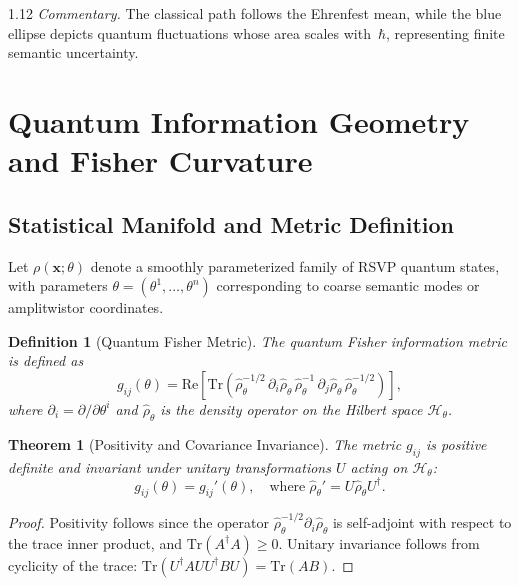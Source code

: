 \documentclass[12pt,a4paper]{article}
\numberwithin{equation}{section}
\newtheorem{definition}{Definition}[section]
\newtheorem{theorem}{Theorem}[section]
\theoremstyle{remark}
\theoremstyle{definition}
\begin{document}
\begin{spacing}{1.12}
\noindent\textit{Commentary.}
The classical path follows the Ehrenfest mean,
while the blue ellipse depicts quantum fluctuations whose area scales with~\(\hbar\),
representing finite semantic uncertainty.

\section{Quantum Information Geometry and Fisher Curvature}\label{sec:fisher-geometry}

\subsection{Statistical Manifold and Metric Definition}

Let \(\rho(\mathbf{x};\theta)\) denote a smoothly parameterized family of RSVP quantum states,
with parameters \(\theta = (\theta^1,\dots,\theta^n)\)
corresponding to coarse semantic modes or amplitwistor coordinates.

\begin{definition}[Quantum Fisher Metric]\label{def:fisher}
The quantum Fisher information metric is defined as
\[
g_{ij}(\theta)
= \mathrm{Re}\!\left[\mathrm{Tr}\!\left(
\hat{\rho}_\theta^{-1/2}\,\partial_i \hat{\rho}_\theta\,
\hat{\rho}_\theta^{-1}\,\partial_j \hat{\rho}_\theta\,
\hat{\rho}_\theta^{-1/2}
\right)\right],
\]
where \(\partial_i = \partial / \partial \theta^i\)
and \(\hat{\rho}_\theta\) is the density operator on the Hilbert space
\(\mathcal{H}_\theta\).
\end{definition}

\begin{theorem}[Positivity and Covariance Invariance]\label{thm:pos}
The metric \(g_{ij}\) is positive definite and invariant under
unitary transformations \(U\) acting on \(\mathcal{H}_\theta\):
\[
g_{ij}(\theta) = g_{ij}'(\theta),
\quad
\text{where}\;
\hat{\rho}_\theta' = U \hat{\rho}_\theta U^\dagger.
\]
\end{theorem}

\begin{proof}
Positivity follows since the operator
\(\hat{\rho}_\theta^{-1/2}\partial_i \hat{\rho}_\theta\) is self-adjoint
with respect to the trace inner product,
and \(\mathrm{Tr}(A^\dagger A)\ge0\).
Unitary invariance follows from cyclicity of the trace:
\(\mathrm{Tr}(U^\dagger A U U^\dagger B U)=\mathrm{Tr}(AB)\).
\end{proof}


\end{spacing}
\end{document}
